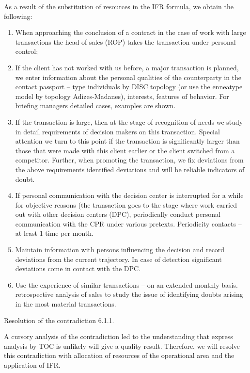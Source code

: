 \documentclass[11pt,a4paper]{book}
\begin{document}
As a result of the substitution of resources in the IFR formula, we obtain the
following:
\begin{enumerate}
\item When approaching the conclusion of a contract in the case of work with
  large transactions the head of sales (ROP) takes the transaction under
  personal control;
\item If the client has not worked with us before, a major transaction is
  planned, we enter information about the personal qualities of the
  counterparty in the contact passport -- type individuals by DISC topology
  (or use the enneatype model by topology Adizes-Madanes), interests, features
  of behavior. For briefing managers detailed cases, examples are shown.
\item If the transaction is large, then at the stage of recognition of needs
  we study in detail requirements of decision makers on this transaction.
  Special attention we turn to this point if the transaction is significantly
  larger than those that were made with this client earlier or the client
  switched from a competitor. Further, when promoting the transaction, we fix
  deviations from the above requirements identified deviations and will be
  reliable indicators of doubt.
\item If personal communication with the decision center is interrupted for a
  while for objective reasons (the transaction goes to the stage where work
  carried out with other decision centers (DPC), periodically conduct personal
  communication with the CPR under various pretexts. Periodicity contacts --
  at least 1 time per month.
\item Maintain information with persons influencing the decision and record
  deviations from the current trajectory. In case of detection significant
  deviations come in contact with the DPC.
\item Use the experience of similar transactions -- on an extended monthly
  basis.  retrospective analysis of sales to study the issue of identifying
  doubts arising in the most material transactions.
\end{enumerate}

Resolution of the contradiction 6.1.1.

A cursory analysis of the contradiction led to the understanding that express
analysis by TOC is unlikely will give a quality result. Therefore, we will
resolve this contradiction with allocation of resources of the operational
area and the application of IFR.
\end{document}

